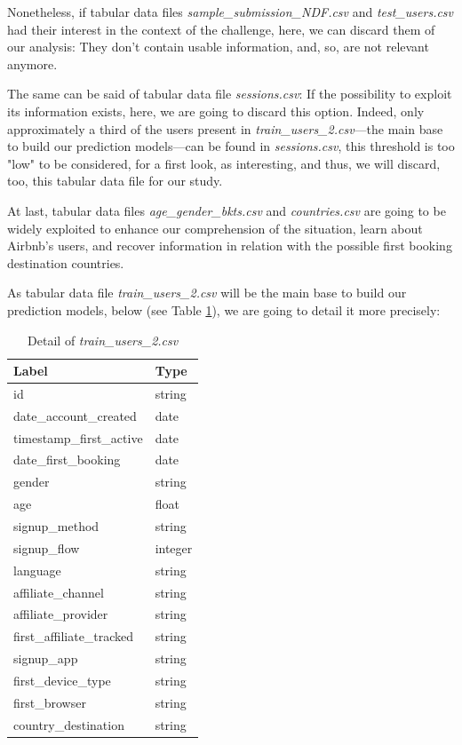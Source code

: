 \documentclass[twocolumn, switch]{article}
\begin{document}
Nonetheless, if tabular data files \textit{sample\_submission\_NDF.csv} and \textit{test\_users.csv} had their interest in the context of the challenge, here, we can discard them of our analysis: They don't contain usable information, and, so, are not relevant anymore.

The same can be said of tabular data file \textit{sessions.csv}: If the possibility to exploit its information exists, here, we are going to discard this option. Indeed, only approximately a third of the users present in \textit{train\_users\_2.csv}---the main base to build our prediction models---can be found in \textit{sessions.csv}, this threshold is too "low" to be considered, for a first look, as interesting, and thus, we will discard, too, this tabular data file for our study.

At last, tabular data files \textit{age\_gender\_bkts.csv} and \textit{countries.csv} are going to be widely exploited to enhance our comprehension of the situation, learn about Airbnb's users, and recover information in relation with the possible first booking destination countries.

As tabular data file \textit{train\_users\_2.csv} will be the main base to build our prediction models, below (see Table \ref{tab:users}), we are going to detail it more precisely:

\begin{table}[H]
\caption{Detail of \textit{train\_users\_2.csv}}
\centering
\begin{tabular}{ll}
\toprule
Label & Type \\
\midrule
id & string \\
date\_account\_created & date \\
timestamp\_first\_active & date \\
date\_first\_booking & date \\
gender & string \\
age & float \\
signup\_method & string \\
signup\_flow & integer \\
language & string \\
affiliate\_channel & string \\
affiliate\_provider & string \\
first\_affiliate\_tracked & string \\
signup\_app & string \\
first\_device\_type & string \\
first\_browser & string \\
country\_destination & string \\
\bottomrule
\end{tabular}
\label{tab:users}
\end{table}
\end{document}
